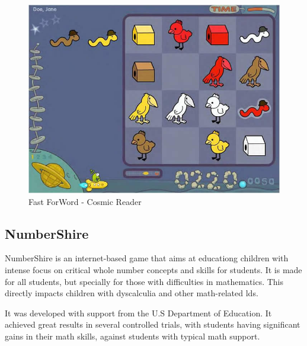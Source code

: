 \begin{figure}[!h]
    \centering
    \includegraphics[width=0.8\linewidth]{Chapters/related_work_img/FastForWord_Cosmic_Reader.jpg}
    \caption{Fast ForWord - Cosmic Reader}
    \label{fig:fastforword}
\end{figure}




\subsection*{NumberShire} 

NumberShire \cite{numbershire} is an internet-based game that aims at educationg children with intense focus on critical whole number concepts and skills for students. It is made for all students, but specially for those with difficulties in mathematics. This directly impacts children with dyscalculia and other math-related \glspl{ld}.

It was developed with support from the U.S Department of Education. It achieved great results in several controlled trials, with students having significant gains in their math skills, against students with typical math support.

